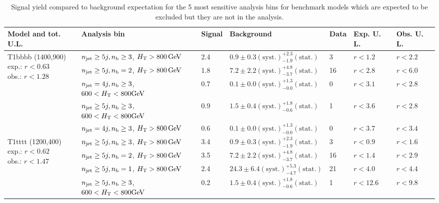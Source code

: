 \newpage
\begin{table}[h!] 
  \scriptsize
  \caption{ 
Signal yield compared to background expectation for the 5 most sensitive analysis bins 
for benchmark models which are expected to be excluded but they are not in the analysis.
  \label{tab:sigBenchmarksYields_excess}}
  \centering 
  \begin{tabular}{ lllllll } 
    \hline 
    \hline 
    Model and tot. U.L. & Analysis bin & Signal & Background & Data & Exp. U. L. & Obs. U. L. \\ \hline
\multirow{5}{*}{\parbox[t]{2cm}{T1bbbb (1400,900)\\exp.: $r<0.63$\\obs.: $r<1.28$}}
 & $n_{\mathrm{jet}} \geq5j,n_{\text{b}} \geq3$, $\mbox{$H_\text{T}$} > 800 \, \mathrm{GeV}$ & 2.4 & $0.9 \pm 0.3 \mathrm{(syst.)} ^{+2.3}_{-1.9} \mathrm{(stat.)}$ & 3 & $r < 1.2$ & $r < 2.2$\\ 
 & $n_{\mathrm{jet}} \geq5j,n_{\text{b}} =2$, $\mbox{$H_\text{T}$} > 800 \, \mathrm{GeV}$ & 1.8 & $7.2 \pm 2.2 \mathrm{(syst.)} ^{+4.8}_{-3.7} \mathrm{(stat.)}$ & 16 & $r < 2.8$ & $r < 6.0$\\ 
 & $n_{\mathrm{jet}} =4j,n_{\text{b}} \geq3$, $600 < \mbox{$H_\text{T}$} < 800 \mathrm{GeV}$ & 0.7 & $0.1 \pm 0.0 \mathrm{(syst.)} ^{+1.3}_{-0.0} \mathrm{(stat.)}$ & 0 & $r < 3.1$ & $r < 2.8$\\ 
 & $n_{\mathrm{jet}} \geq5j,n_{\text{b}} \geq3$, $600 < \mbox{$H_\text{T}$} < 800 \mathrm{GeV}$ & 0.9 & $1.5 \pm 0.4 \mathrm{(syst.)} ^{+1.8}_{-0.6} \mathrm{(stat.)}$ & 1 & $r < 3.6$ & $r < 2.8$\\ 
 & $n_{\mathrm{jet}} =4j,n_{\text{b}} \geq3$, $\mbox{$H_\text{T}$} > 800 \, \mathrm{GeV}$ & 0.6 & $0.1 \pm 0.0 \mathrm{(syst.)} ^{+1.3}_{-0.0} \mathrm{(stat.)}$ & 0 & $r < 3.7$ & $r < 3.4$\\ \hline
\multirow{5}{*}{\parbox[t]{2cm}{T1tttt (1200,400)\\exp.: $r<0.62$\\obs.: $r<1.47$}}
 & $n_{\mathrm{jet}} \geq5j,n_{\text{b}} \geq3$, $\mbox{$H_\text{T}$} > 800 \, \mathrm{GeV}$ & 3.4 & $0.9 \pm 0.3 \mathrm{(syst.)} ^{+2.3}_{-1.9} \mathrm{(stat.)}$ & 3 & $r < 0.9$ & $r < 1.6$\\ 
 & $n_{\mathrm{jet}} \geq5j,n_{\text{b}} =2$, $\mbox{$H_\text{T}$} > 800 \, \mathrm{GeV}$ & 3.5 & $7.2 \pm 2.2 \mathrm{(syst.)} ^{+4.8}_{-3.7} \mathrm{(stat.)}$ & 16 & $r < 1.4$ & $r < 2.9$\\ 
 & $n_{\mathrm{jet}} \geq5j,n_{\text{b}} =1$, $\mbox{$H_\text{T}$} > 800 \, \mathrm{GeV}$ & 2.4 & $24.3 \pm 6.4 \mathrm{(syst.)} ^{+5.3}_{-4.7} \mathrm{(stat.)}$ & 21 & $r < 4.0$ & $r < 4.4$\\ 
 & $n_{\mathrm{jet}} \geq5j,n_{\text{b}} \geq3$, $600 < \mbox{$H_\text{T}$} < 800 \mathrm{GeV}$ & 0.2 & $1.5 \pm 0.4 \mathrm{(syst.)} ^{+1.8}_{-0.6} \mathrm{(stat.)}$ & 1 & $r < 12.6$ & $r < 9.8$\\ 

\end{tabular}
\end{table}
